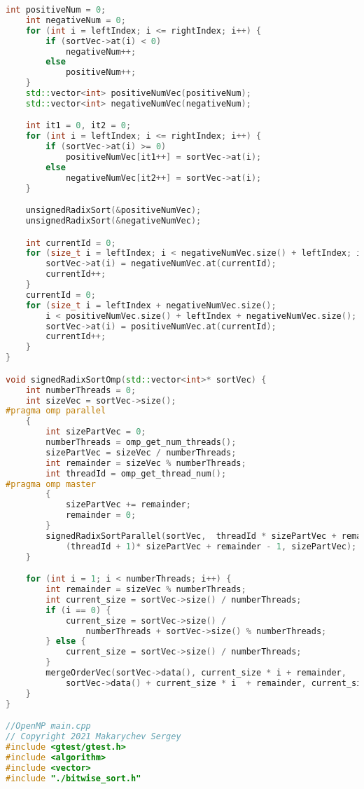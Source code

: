 \documentclass{report}
\begin{document}
\begin{lstlisting}[language=C++]
    int positiveNum = 0;
    int negativeNum = 0;
    for (int i = leftIndex; i <= rightIndex; i++) {
        if (sortVec->at(i) < 0)
            negativeNum++;
        else
            positiveNum++;
    }
    std::vector<int> positiveNumVec(positiveNum);
    std::vector<int> negativeNumVec(negativeNum);

    int it1 = 0, it2 = 0;
    for (int i = leftIndex; i <= rightIndex; i++) {
        if (sortVec->at(i) >= 0)
            positiveNumVec[it1++] = sortVec->at(i);
        else
            negativeNumVec[it2++] = sortVec->at(i);
    }

    unsignedRadixSort(&positiveNumVec);
    unsignedRadixSort(&negativeNumVec);

    int currentId = 0;
    for (size_t i = leftIndex; i < negativeNumVec.size() + leftIndex; i++) {
        sortVec->at(i) = negativeNumVec.at(currentId);
        currentId++;
    }
    currentId = 0;
    for (size_t i = leftIndex + negativeNumVec.size();
        i < positiveNumVec.size() + leftIndex + negativeNumVec.size(); i++) {
        sortVec->at(i) = positiveNumVec.at(currentId);
        currentId++;
    }
}

void signedRadixSortOmp(std::vector<int>* sortVec) {
    int numberThreads = 0;
    int sizeVec = sortVec->size();
#pragma omp parallel
    {
        int sizePartVec = 0;
        numberThreads = omp_get_num_threads();
        sizePartVec = sizeVec / numberThreads;
        int remainder = sizeVec % numberThreads;
        int threadId = omp_get_thread_num();
#pragma omp master
        {
            sizePartVec += remainder;
            remainder = 0;
        }
        signedRadixSortParallel(sortVec,  threadId * sizePartVec + remainder,
            (threadId + 1)* sizePartVec + remainder - 1, sizePartVec);
    }

    for (int i = 1; i < numberThreads; i++) {
        int remainder = sizeVec % numberThreads;
        int current_size = sortVec->size() / numberThreads;
        if (i == 0) {
            current_size = sortVec->size() /
                numberThreads + sortVec->size() % numberThreads;
        } else {
            current_size = sortVec->size() / numberThreads;
        }
        mergeOrderVec(sortVec->data(), current_size * i + remainder,
            sortVec->data() + current_size * i  + remainder, current_size);
    }
}

//OpenMP main.cpp
// Copyright 2021 Makarychev Sergey
#include <gtest/gtest.h>
#include <algorithm>
#include <vector>
#include "./bitwise_sort.h"


\end{lstlisting}
\end{document}
